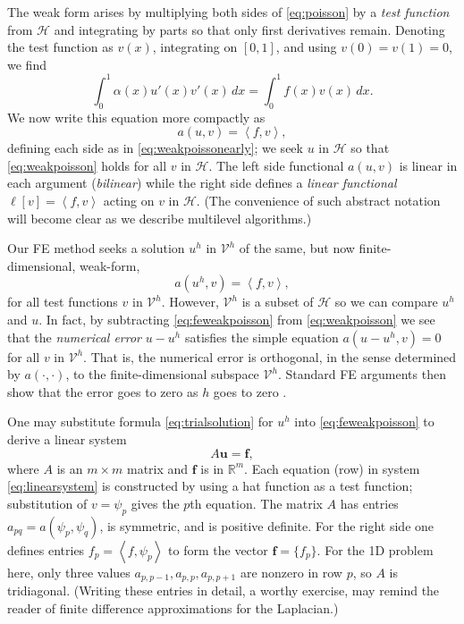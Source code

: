\documentclass[letterpaper,final,12pt,reqno]{amsart}
\theoremstyle{claim}
\newcommand{\RR}{\mathbb{R}}
\newcommand{\bbf}{\mathbf{f}}
\newcommand{\bu}{\mathbf{u}}
\newcommand{\ip}[2]{\left<#1,#2\right>}
\numberwithin{equation}{section}
\numberwithin{figure}{section}
\numberwithin{table}{section}
\numberwithin{theorem}{section}
\begin{document}
The weak form arises by multiplying both sides of \eqref{eq:poisson} by a \emph{test function} from $\mathcal{H}$ and integrating by parts so that only first derivatives remain.  Denoting the test function as $v(x)$, integrating on $[0,1]$, and using $v(0)=v(1)=0$, we find
\begin{equation}
\int_0^1 \alpha(x) u'(x) v'(x)\,dx = \int_0^1 f(x) v(x)\, dx.  \label{eq:weakpoissonearly}
\end{equation}
We now write this equation more compactly as
\begin{equation}
  a(u,v) = \ip{f}{v}, \label{eq:weakpoisson}
\end{equation}
defining each side as in \eqref{eq:weakpoissonearly}; we seek $u$ in $\mathcal{H}$ so that \eqref{eq:weakpoisson} holds for all $v$ in $\mathcal{H}$.  The left side functional $a(u,v)$ is linear in each argument (\emph{bilinear}) while the right side defines a \emph{linear functional} $\ell[v] = \ip{f}{v}$ acting on $v$ in $\mathcal{H}$.  (The convenience of such abstract notation will become clear as we describe multilevel algorithms.)

Our FE method seeks a solution $u^h$ in $\mathcal{V}^h$ of the same, but now finite-dimensional, weak-form,
\begin{equation}
  a(u^h,v) = \ip{f}{v},  \label{eq:feweakpoisson}
\end{equation}
for all test functions $v$ in $\mathcal{V}^h$.  However, $\mathcal{V}^h$ is a subset of $\mathcal{H}$ so we can compare $u^h$ and $u$.  In fact, by subtracting \eqref{eq:feweakpoisson} from \eqref{eq:weakpoisson} we see that the \emph{numerical error} $u-u^h$ satisfies the simple equation $a(u-u^h,v)=0$ for all $v$ in $\mathcal{V}^h$.  That is, the numerical error is orthogonal, in the sense determined by $a(\cdot,\cdot)$, to the finite-dimensional subspace $\mathcal{V}^h$.  Standard FE arguments then show that the error goes to zero as $h$ goes to zero \cite{Braess2007,Elmanetal2014}.

One may substitute formula \eqref{eq:trialsolution} for $u^h$ into \eqref{eq:feweakpoisson} to derive a linear system
\begin{equation}
A \bu = \bbf, \label{eq:linearsystem}
\end{equation}
where $A$ is an $m\times m$ matrix and $\bbf$ is in $\RR^m$.  Each equation (row) in system \eqref{eq:linearsystem} is constructed by using a hat function as a test function; substitution of $v=\psi_p$ gives the $p$th equation.  The matrix $A$ has entries $a_{pq} = a(\psi_p,\psi_q)$, is symmetric, and is positive definite.  For the right side one defines entries $f_p = \ip{f}{\psi_p}$ to form the vector $\bbf = \{f_p\}$.  For the 1D problem here, only three values $a_{p,p-1}, a_{p,p}, a_{p,p+1}$ are nonzero in row $p$, so $A$ is tridiagonal.  (Writing these entries in detail, a worthy exercise, may remind the reader of finite difference approximations for the Laplacian.)
\end{document}
